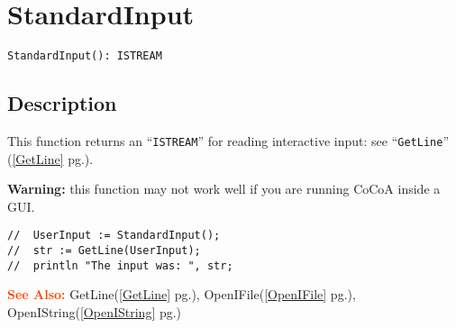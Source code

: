 \documentclass[a4paper]{mybook}
\newenvironment{command}{}{} %
\newcommand\SeeAlso{\par\textcolor{OrangeRed}{\textbf{\large See Also: }}}
\begin{document}
\section{StandardInput}
\label{StandardInput}
\begin{command} %


\begin{Verbatim}[label=syntax, rulecolor=\color{MidnightBlue},
frame=single]
StandardInput(): ISTREAM
\end{Verbatim}


\subsection*{Description}

This function returns an ``\verb&ISTREAM&'' for reading interactive input: see ``\verb&GetLine&'' (\ref{GetLine} pg.\pageref{GetLine}).
\par 
\textbf{Warning:} this function may not work well if you are running CoCoA inside a GUI.
\begin{Verbatim}[label=example, rulecolor=\color{PineGreen}, frame=single]
//  UserInput := StandardInput();
//  str := GetLine(UserInput);
//  println "The input was: ", str;
\end{Verbatim}


\SeeAlso %
  GetLine(\ref{GetLine} pg.\pageref{GetLine}), 
    OpenIFile(\ref{OpenIFile} pg.\pageref{OpenIFile}), 
    OpenIString(\ref{OpenIString} pg.\pageref{OpenIString})
\end{command} %
\end{document}
